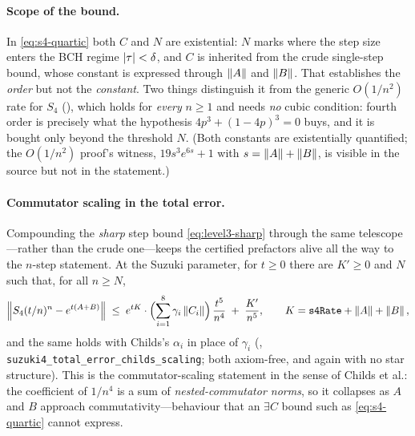 \paragraph{Scope of the bound.}
In \cref{eq:s4-quartic} both $C$ and $N$ are existential: $N$ marks where the
step size enters the BCH regime $\left|\tau\right| < \delta$, and $C$ is inherited
from the crude single-step bound, whose constant is expressed through
$\left\|A\right\|$ and $\left\|B\right\|$. That establishes the \emph{order} but not the
\emph{constant}. Two things distinguish it from the generic $O(1/n^2)$ rate for
$S_4$ (), which holds for
\emph{every} $n \ge 1$ and needs \emph{no} cubic condition: fourth order is
precisely what the hypothesis $4p^3 + (1-4p)^3 = 0$ buys, and it is bought only
beyond the threshold $N$. (Both constants are existentially quantified; the
$O(1/n^2)$ proof's witness, $19 s^3 e^{6s} + 1$ with $s = \left\|A\right\| + \left\|B\right\|$,
is visible in the source but not in the statement.)

\paragraph{Commutator scaling in the total error.}
Compounding the \emph{sharp} step bound \eqref{eq:level3-sharp} through the same
telescope---rather than the crude one---keeps the certified prefactors alive all
the way to the $n$-step statement. At the Suzuki parameter, for $t \ge 0$ there
are $K' \ge 0$ and $N$ such that, for all $n \ge N$,
\begin{equation}\label{eq:s4-quartic-comm}
  \left\|S_4(t/n)^n - e^{t(A+B)}\right\|
    \;\le\;
  e^{tK} \cdot \Bigl(\sum_{i=1}^{8} \gamma_i \left\|C_i\right\|\Bigr)\,
    \frac{t^5}{n^4}
  \;+\; \frac{K'}{n^5},
  \qquad K = \texttt{s4Rate} + \left\|A\right\| + \left\|B\right\|,
\end{equation}
and the same holds with Childs's $\alpha_i$ in place of $\gamma_i$
(,
\texttt{suzuki4\_total\_error\_childs\_scaling}; both axiom-free, and again with
no star structure). This is the commutator-scaling statement in the sense of
Childs et al.: the coefficient of $1/n^4$ is a sum of \emph{nested-commutator
norms}, so it collapses as $A$ and $B$ approach commutativity---behaviour that
an $\exists C$ bound such as \cref{eq:s4-quartic} cannot express.

